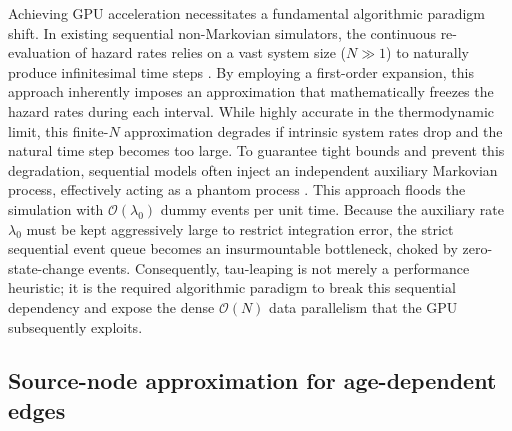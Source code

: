 Achieving GPU acceleration necessitates a fundamental algorithmic paradigm shift. In existing sequential non-Markovian simulators, the continuous re-evaluation of hazard rates relies on a vast system size ($N \gg 1$) to naturally produce infinitesimal time steps \citep{boguna2014simulating}. By employing a first-order expansion, this approach inherently imposes an approximation that mathematically freezes the hazard rates during each interval. While highly accurate in the thermodynamic limit, this finite-$N$ approximation degrades if intrinsic system rates drop and the natural time step becomes too large. To guarantee tight bounds and prevent this degradation, sequential models often inject an independent auxiliary Markovian process, effectively acting as a phantom process \citep{vajdi2020stochastic}. This approach floods the simulation with $\mathcal{O}(\lambda_0)$ dummy events per unit time. Because the auxiliary rate $\lambda_0$ must be kept aggressively large to restrict integration error, the strict sequential event queue becomes an insurmountable bottleneck, choked by zero-state-change events. Consequently, tau-leaping is not merely a performance heuristic; it is the required algorithmic paradigm to break this sequential dependency and expose the dense $\mathcal{O}(N)$ data parallelism that the GPU subsequently exploits.

\subsection{Source-node approximation for age-dependent edges}
\label{sec:source_node_approx}

